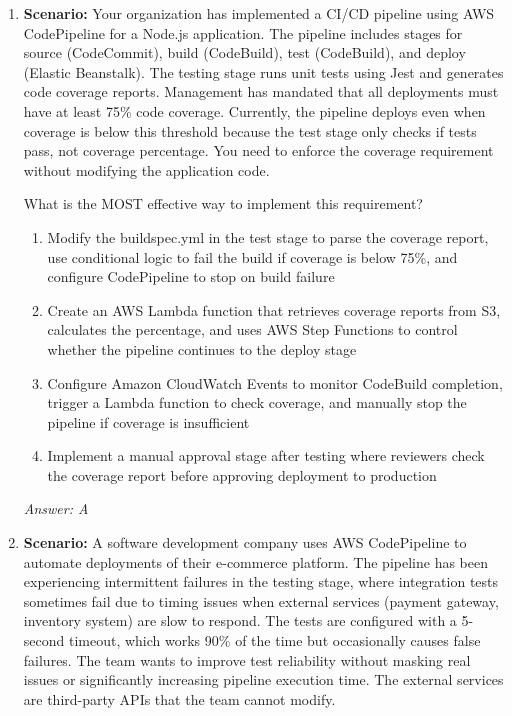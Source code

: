 \documentclass[12pt,a4paper]{article}
\begin{document}
\begin{enumerate}[label=\textbf{Q\arabic*.}]
\textit{Answer: A}

\item \textbf{Scenario:} Your organization has implemented a CI/CD pipeline using AWS CodePipeline for a Node.js application. The pipeline includes stages for source (CodeCommit), build (CodeBuild), test (CodeBuild), and deploy (Elastic Beanstalk). The testing stage runs unit tests using Jest and generates code coverage reports. Management has mandated that all deployments must have at least 75\% code coverage. Currently, the pipeline deploys even when coverage is below this threshold because the test stage only checks if tests pass, not coverage percentage. You need to enforce the coverage requirement without modifying the application code.

What is the MOST effective way to implement this requirement?

\begin{enumerate}[label=\Alph*.]
    \item Modify the buildspec.yml in the test stage to parse the coverage report, use conditional logic to fail the build if coverage is below 75\%, and configure CodePipeline to stop on build failure
    \item Create an AWS Lambda function that retrieves coverage reports from S3, calculates the percentage, and uses AWS Step Functions to control whether the pipeline continues to the deploy stage
    \item Configure Amazon CloudWatch Events to monitor CodeBuild completion, trigger a Lambda function to check coverage, and manually stop the pipeline if coverage is insufficient
    \item Implement a manual approval stage after testing where reviewers check the coverage report before approving deployment to production
\end{enumerate}

\textit{Answer: A}

\item \textbf{Scenario:} A software development company uses AWS CodePipeline to automate deployments of their e-commerce platform. The pipeline has been experiencing intermittent failures in the testing stage, where integration tests sometimes fail due to timing issues when external services (payment gateway, inventory system) are slow to respond. The tests are configured with a 5-second timeout, which works 90\% of the time but occasionally causes false failures. The team wants to improve test reliability without masking real issues or significantly increasing pipeline execution time. The external services are third-party APIs that the team cannot modify.


\end{enumerate}
\end{document}
